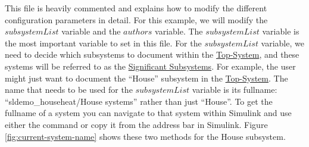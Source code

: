 \documentclass{mcscert}
\newcommand{\simulink}{Simulink}
\newcommand{\topsystemnolink}{Top-System} %
\newcommand{\topsystem}{\hyperref[def:topsystem]{\topsystemnolink{}}}
\newcommand{\sigsubsnolink}{Significant Subsystems} %
\newcommand{\sigsubs}{\hyperref[def:sigsubs]{\sigsubsnolink{}}}
\begin{document}
This file is heavily commented and explains how to modify the different configuration parameters in detail. 
For this example, we will modify the $subsystemList$ variable and the $authors$ variable. The $subsystemList$ variable is the most important variable to set in this file. 
For the $subsystemList$ variable, we need to decide which subsystems to document within the \topsystem{}, and these systems will be referred to as the \sigsubs{}. 
For example, the user might just want to document the ``House'' subsystem in the \topsystem{}. 
The name that needs to be used for the $subsystemList$ variable is its fullname: ``sldemo\_househeat/House systems'' rather than just ``House''. 
To get the fullname of a system you can navigate to that system within \simulink{} and use either the  command or copy it from the address bar in \simulink{}. 
Figure \ref{fig:current-system-name} shows these two methods for the House subsystem.
\end{document}
